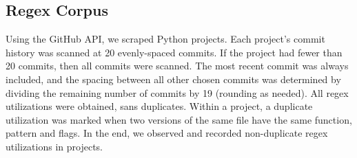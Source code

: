 \subsection{Regex Corpus}
\label{study:corpus}
Using the GitHub API, we scraped  Python projects.
Each project's commit history was scanned at 20 evenly-spaced commits.  If the project had fewer than 20 commits, then all commits were scanned.  The most recent commit was always included, and the spacing between all other chosen commits was determined by dividing the remaining number of commits by 19 (rounding as needed).
All regex utilizations were obtained, sans duplicates. Within a project, a duplicate utilization was marked when two versions of the same file have the same function, pattern and flags.  In the end, we observed and recorded  non-duplicate regex utilizations in  projects.

